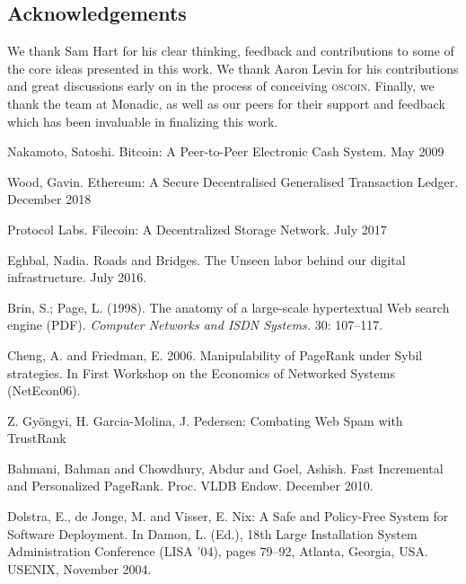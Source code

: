 \documentclass[a4paper, oneside, 10pt, final]{amsart}
\def\oscoin{\textsc{\small{oscoin}}}
\begin{document}
\setlength{\columnsep}{1cm}
\begin{multicols}{2}







\pagebreak


\section*{Acknowledgements}
We thank Sam Hart for his clear thinking, feedback and contributions to some of
the core ideas presented in this work. We thank Aaron Levin for his contributions
and great discussions early on in the process of conceiving \oscoin{}. Finally,
we thank the team at Monadic, as well as our peers for their support and feedback
which has been invaluable in finalizing this work.

\begin{thebibliography}{9}

 Nakamoto, Satoshi. Bitcoin: A Peer-to-Peer Electronic Cash
  System. May 2009

 Wood, Gavin. Ethereum: A Secure Decentralised Generalised
  Transaction Ledger. December 2018

 Protocol Labs. Filecoin: A Decentralized Storage Network.
  July 2017

 Eghbal, Nadia. Roads and Bridges. The Unseen labor
  behind our digital infrastructure. July 2016.

 Brin, S.; Page, L. (1998). The anatomy of a
  large-scale hypertextual Web search engine (PDF). \emph{Computer Networks
  and ISDN Systems.} 30: 107–117.

 Cheng, A. and Friedman, E. 2006. Manipulability of
  PageRank under Sybil strategies. In First Workshop on the Economics of
  Networked Systems (NetEcon06).

 Z. Gyöngyi, H. Garcia-Molina, J. Pedersen: Combating Web
  Spam with TrustRank

 Bahmani, Bahman and Chowdhury, Abdur and Goel,
  Ashish. Fast Incremental and Personalized PageRank. Proc. VLDB
  Endow. December 2010.

 Dolstra, E., de Jonge, M. and Visser, E. Nix: A Safe and
  Policy-Free System for Software Deployment. In Damon, L. (Ed.), 18th Large
  Installation System Administration Conference (LISA '04), pages 79–92, Atlanta,
  Georgia, USA. USENIX, November 2004.

\end{thebibliography}

\end{multicols}
\end{document}
